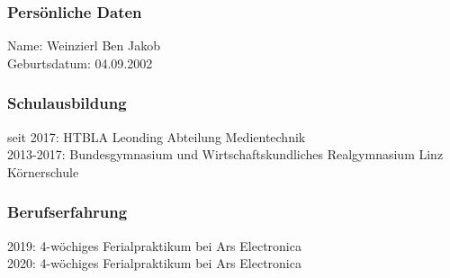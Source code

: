 \subsubsection{Persönliche Daten}
Name: Weinzierl Ben Jakob\\
Geburtsdatum: 04.09.2002
\subsubsection{Schulausbildung}
seit 2017: HTBLA Leonding Abteilung Medientechnik \\
2013-2017: Bundesgymnasium und Wirtschaftskundliches Realgymnasium Linz Körnerschule
\subsubsection{Berufserfahrung}
2019: 4-wöchiges Ferialpraktikum bei Ars Electronica\\
2020: 4-wöchiges Ferialpraktikum bei Ars Electronica

